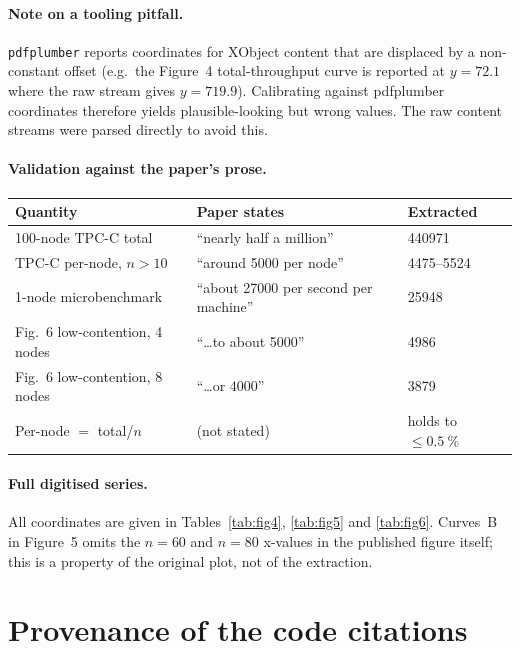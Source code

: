 \documentclass[11pt,a4paper]{article}
\begin{document}
\paragraph{Note on a tooling pitfall.} \texttt{pdfplumber} reports coordinates
for XObject content that are displaced by a non-constant offset (e.g.\ the
Figure~4 total-throughput curve is reported at $y=72.1$ where the raw stream
gives $y=719.9$). Calibrating against pdfplumber coordinates therefore yields
plausible-looking but wrong values. The raw content streams were parsed
directly to avoid this.

\paragraph{Validation against the paper's prose.}

\begin{table}[H]
\centering
\begin{tabular}{@{}lll@{}}
\toprule
\textbf{Quantity} & \textbf{Paper states} & \textbf{Extracted} \\
\midrule
100-node TPC-C total & ``nearly half a million'' & \num{440971} \\
TPC-C per-node, $n>10$ & ``around \num{5000} per node'' & \num{4475}--\num{5524} \\
1-node microbenchmark & ``about \num{27000} per second per machine'' & \num{25948} \\
Fig.~6 low-contention, 4 nodes & ``\ldots{}to about \num{5000}'' & \num{4986} \\
Fig.~6 low-contention, 8 nodes & ``\ldots{}or \num{4000}'' & \num{3879} \\
Per-node $= $ total/$n$ & (not stated) & holds to $\le\SI{0.5}{\percent}$ \\
\bottomrule
\end{tabular}
\end{table}

\paragraph{Full digitised series.} All coordinates are given in
Tables~\ref{tab:fig4}, \ref{tab:fig5} and \ref{tab:fig6}. Curves~B in
Figure~5 omits the $n=60$ and $n=80$ x-values in the published figure itself;
this is a property of the original plot, not of the extraction.

\section{Provenance of the code citations}
\label{app:code}
\end{document}
